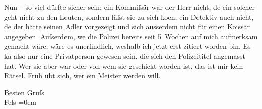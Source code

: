 \pstart
           Nun – so viel dürfte sicher sein: ein Kommiſsär war der Herr nicht, de{\geminationn} ein solcher geht nicht zu den Leuten, sondern läſst
               sie zu sich ko{\geminationm}en; ein Detektiv auch nicht, de{\geminationn} der {\pb}hätte seinen Adler
               vorgezeigt und sich ausserdem nicht für einen Ko{\geminationm}issär
               angegeben. Auſserdem, we{\geminationn} die Polizei bereits seit
               5 Wochen auf mich aufmerksam gemacht wäre, wäre es unerfindlich, weshalb ich jetzt
               erst zitiert worden bin. Es ka{\geminationn} also nur eine
               Privatperson gewesen sein, die sich den Polizeititel angemasst hat. Wer sie aber war
               oder von wem sie geschickt worden ist, das ist mir kein Rätsel. Früh übt sich, wer
               ein Meister werden will.\pend
           
\pstart
           Besten Gruſs{\\[\baselineskip]}\spacefill\mbox{Fels}\pend
           \leftskip=0em{}\endnumbering{}  
      